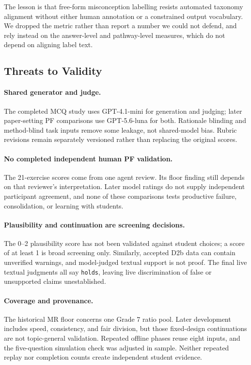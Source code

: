 The lesson is that free-form misconception labelling resists automated taxonomy alignment without either human annotation or a constrained output vocabulary. We dropped the metric rather than report a number we could not defend, and rely instead on the answer-level and pathway-level measures, which do not depend on aligning label text.

\subsection{Threats to Validity}

\paragraph{Shared generator and judge.} The completed MCQ study uses GPT-4.1-mini for generation and judging; later paper-setting PF comparisons use GPT-5.6-luna for both. Rationale blinding and method-blind task inputs remove some leakage, not shared-model bias. Rubric revisions remain separately versioned rather than replacing the original scores.

\paragraph{No completed independent human PF validation.} The 21-exercise scores come from one agent review. Its floor finding still depends on that reviewer's interpretation. Later model ratings do not supply independent participant agreement, and none of these comparisons tests productive failure, consolidation, or learning with students.

\paragraph{Plausibility and continuation are screening decisions.} The 0--2 plausibility score has not been validated against student choices; a score of at least 1 is broad screening only. Similarly, accepted D2b data can contain unverified warnings, and model-judged textual support is not proof. The final live textual judgments all say \texttt{holds}, leaving live discrimination of false or unsupported claims unestablished.

\paragraph{Coverage and provenance.} The historical MR floor concerns one Grade 7 ratio pool. Later development includes speed, consistency, and fair division, but those fixed-design continuations are not topic-general validation. Repeated offline phases reuse eight inputs, and the five-question simulation check was adjusted in sample. Neither repeated replay nor completion counts create independent student evidence.

